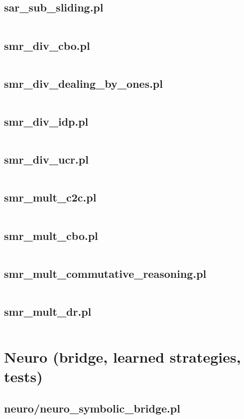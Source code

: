 \documentclass{article}
\begin{document}
\subsection{sar\_sub\_sliding.pl}
\inputminted{prolog}{sar_sub_sliding.pl}
\subsection{smr\_div\_cbo.pl}
\inputminted{prolog}{smr_div_cbo.pl}
\subsection{smr\_div\_dealing\_by\_ones.pl}
\inputminted{prolog}{smr_div_dealing_by_ones.pl}
\subsection{smr\_div\_idp.pl}
\inputminted{prolog}{smr_div_idp.pl}
\subsection{smr\_div\_ucr.pl}
\inputminted{prolog}{smr_div_ucr.pl}
\subsection{smr\_mult\_c2c.pl}
\inputminted{prolog}{smr_mult_c2c.pl}
\subsection{smr\_mult\_cbo.pl}
\inputminted{prolog}{smr_mult_cbo.pl}
\subsection{smr\_mult\_commutative\_reasoning.pl}
\inputminted{prolog}{smr_mult_commutative_reasoning.pl}
\subsection{smr\_mult\_dr.pl}
\inputminted{prolog}{smr_mult_dr.pl}

\section{Neuro (bridge, learned strategies, tests)}
\subsection{neuro/neuro\_symbolic\_bridge.pl}
\inputminted{prolog}{neuro/neuro_symbolic_bridge.pl}
\end{document}
